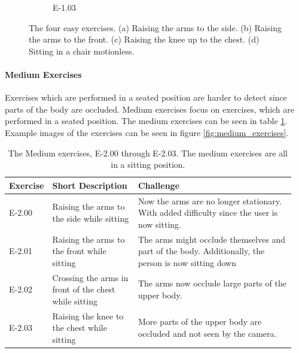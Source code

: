 \begin{figure}[ht]
\begin{subfigure}[b]{0.16\linewidth}
        \caption[]{E-1.03}
    \end{subfigure}
    \caption[Easy Exercises]{The four easy exercises. (a) Raising the arms to the side. (b) Raising the arms to the front. (c) Raising the knee up to the chest. (d) Sitting in a chair motionless.}
    \label{fig:easy_exercises}
  \end{figure}  

\paragraph{Medium Exercises}

Exercises which are performed in a seated position are harder to detect since parts of the body are occluded. Medium exercises focus on exercises, which are performed in a seated position. The medium exercises can be seen in table \ref{tab:medium_exercises}. Example images of the exercises can be seen in figure \ref{fig:medium_exercises}.

\begin{table}[ht]
  \caption[Medium Exercises]{The Medium exercises, E-2.00 through E-2.03. The medium exercises are all in a sitting position.}
  \label{tab:medium_exercises}
  \begin{tabular}{p{0.1\linewidth}p{0.3\linewidth}p{0.55\linewidth}}
  \hline
  Exercise & Short Description                                     & Challenge \\ \hline
  E-2.00   & Raising the arms to the side while sitting            & Now the arms are no longer stationary. With added difficulty since the user is now sitting.         \\
  E-2.01   & Raising the arms to the front while sitting           & The arms might occlude themselves and part of the body. Additionally, the person is now sitting down\\
  E-2.02   & Crossing the arms in front of the chest while sitting & The arms now occlude large parts of the upper body.                                                                                            \\
  E-2.03   & Raising the knee to the chest while sitting           & More parts of the upper body are occluded and not seen by the camera.                              \\ \hline
  \end{tabular}
  \end{table}



